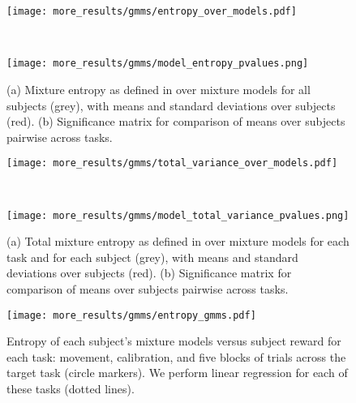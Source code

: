 \documentclass[../main.tex]{subfiles}
\begin{document}
\begin{figure}[!htb]
  \centering
  \begin{minipage}{\textwidth}
    \centering
    \texttt{[image: more\_results/gmms/entropy\_over\_models.pdf]}
    \subcaption{}
  \end{minipage}\\%
  \begin{minipage}{\textwidth}
    \centering
    \texttt{[image: more\_results/gmms/model\_entropy\_pvalues.png]}
    \subcaption{}
  \end{minipage}
  \caption[Entropy of subject GMMs]{(a) Mixture entropy as defined in  over mixture models for all subjects (grey), with means and standard deviations over subjects (red). (b) Significance matrix for comparison of means over subjects pairwise across tasks.}\label{fig:gmm_entropies}
\end{figure}

\begin{figure}[!htb]
  \centering
  \begin{minipage}{\textwidth}
    \centering
    \texttt{[image: more\_results/gmms/total\_variance\_over\_models.pdf]}
    \subcaption{}
  \end{minipage}\\%
  \begin{minipage}{\textwidth}
    \centering
    \texttt{[image: more\_results/gmms/model\_total\_variance\_pvalues.png]}
    \subcaption{}
  \end{minipage}
  \caption[Total variance of subject GMMs]{(a) Total mixture entropy as defined in  over mixture models for each task and for each subject (grey), with means and standard deviations over subjects (red). (b) Significance matrix for comparison of means over subjects pairwise across tasks.}\label{fig:gmm_variances}
\end{figure}

\begin{figure}[!htb]
  \centering
    \texttt{[image: more\_results/gmms/entropy\_gmms.pdf]}
    \caption[Mixture entropy versus mean reward]{Entropy of each subject's mixture models versus subject reward for each task: movement, calibration, and five blocks of trials across the target task (circle markers). We perform linear regression for each of these tasks (dotted lines).}\label{fig:gmm_entropy_vs_reward}
\end{figure}
\end{document}
